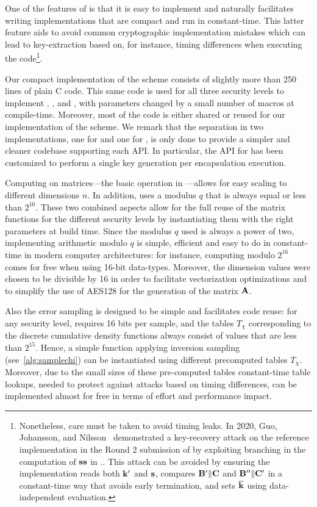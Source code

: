 \documentclass{iacrcc}
\begin{document}
\else

One of the features of \FrodoKEM is that it is easy to implement and naturally facilitates
writing implementations that are compact and run in constant-time.
This latter feature aids to avoid common cryptographic implementation mistakes which can lead
to key-extraction based on, for instance, timing differences when executing the code\footnote{Nonetheless,
care must be taken to avoid timing leaks. In 2020, Guo, Johansson, and Nilsson~\cite{}
demonstrated a key-recovery attack on the reference implementation in the Round 2 submission of \FrodoKEM
by exploiting branching in the computation of $\mathbf{s}\mathbf{s}$ in \FrodoKEM.\Decaps. This attack can be avoided
by ensuring the implementation reads both $\mathbf{k}'$ and $\mathbf{s}$, compares $\mathbf{B}' \| \mathbf{C}$ and $\mathbf{B}'' \| \mathbf{C}'$
in a constant-time way that avoids early termination, and sets $\overline{\mathbf{k}}$ using data-independent evaluation.}.

Our compact implementation of the \FrodoKEM scheme consists of slightly more than 250 lines of plain C code.
This same code is used for all three security levels to implement \FrodoKEMLOne, \FrodoKEMLThree, and \FrodoKEMLFive,
with parameters changed by a small number of macros at compile-time.
Moreover, most of the code is either shared or reused for our implementation of the \eFrodoKEM scheme.
We remark that the separation in two implementations, one for \FrodoKEM and one for \eFrodoKEM, is only
done to provide a simpler and cleaner codebase supporting each API. 
In particular, the API for \eFrodoKEM has been customized to perform a single key generation
per encapsulation execution.    

Computing on matrices---the basic operation in \FrodoKEM---allows for easy scaling to different dimensions $n$.
In addition, \FrodoKEM uses a modulus $q$ that is always equal or less than $2^{16}$. These two combined
aspects allow for the full reuse of the matrix functions for the different security levels by instantiating them
with the right parameters at build time. Since the modulus $q$ used is always a power of two, implementing
arithmetic modulo $q$ is simple, efficient and easy to do in constant-time in modern computer architectures:
for instance, computing modulo $2^{16}$ comes for free when using 16-bit data-types. Moreover, the dimension
values were chosen to be divisible by 16 in order to facilitate vectorization optimizations and to simplify the
use of AES128 for the generation of the matrix $\mathbf{A}$.

Also the error sampling is designed to be simple and facilitates code reuse: for any security level, \FrodoKEM
requires 16 bits per sample, and the tables $T_\chi$ corresponding to the discrete cumulative density functions
always consist of values that are less than $2^{15}$. Hence, a simple function applying inversion sampling
(see~\autoref{alg:samplechi}) can be instantiated using different precomputed tables $T_\chi$. Moreover, due to
the small sizes of these pre-computed tables constant-time table lookups, needed to protect against attacks
based on timing differences, can be implemented almost for free in terms of effort and performance impact.
\fi
\end{document}
